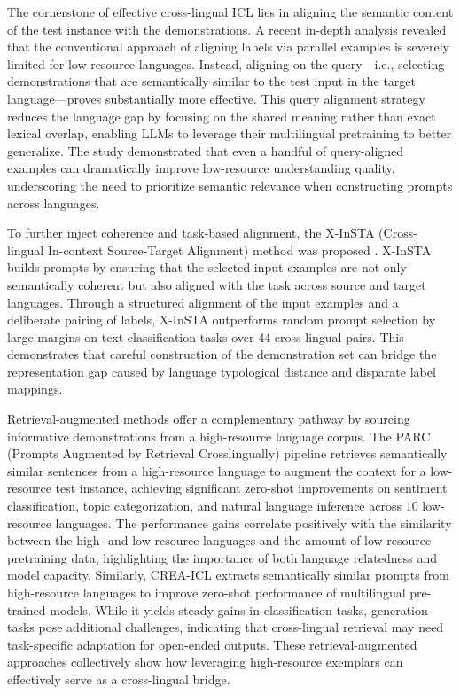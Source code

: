 \documentclass[11pt]{article}
\begin{document}
The cornerstone of effective cross-lingual ICL lies in aligning the semantic content of the test instance with the demonstrations. A recent in-depth analysis \cite{ref128} revealed that the conventional approach of aligning labels via parallel examples is severely limited for low-resource languages. Instead, aligning on the query---i.e., selecting demonstrations that are semantically similar to the test input in the target language---proves substantially more effective. This query alignment strategy reduces the language gap by focusing on the shared meaning rather than exact lexical overlap, enabling LLMs to leverage their multilingual pretraining to better generalize. The study demonstrated that even a handful of query-aligned examples can dramatically improve low-resource understanding quality, underscoring the need to prioritize semantic relevance when constructing prompts across languages.

To further inject coherence and task-based alignment, the X-InSTA (Cross-lingual In-context Source-Target Alignment) method was proposed \cite{ref127}. X-InSTA builds prompts by ensuring that the selected input examples are not only semantically coherent but also aligned with the task across source and target languages. Through a structured alignment of the input examples and a deliberate pairing of labels, X-InSTA outperforms random prompt selection by large margins on text classification tasks over 44 cross-lingual pairs. This demonstrates that careful construction of the demonstration set can bridge the representation gap caused by language typological distance and disparate label mappings.

Retrieval-augmented methods offer a complementary pathway by sourcing informative demonstrations from a high-resource language corpus. The PARC (Prompts Augmented by Retrieval Crosslingually) pipeline \cite{ref129} retrieves semantically similar sentences from a high-resource language to augment the context for a low-resource test instance, achieving significant zero-shot improvements on sentiment classification, topic categorization, and natural language inference across 10 low-resource languages. The performance gains correlate positively with the similarity between the high- and low-resource languages and the amount of low-resource pretraining data, highlighting the importance of both language relatedness and model capacity. Similarly, CREA-ICL \cite{ref130} extracts semantically similar prompts from high-resource languages to improve zero-shot performance of multilingual pre-trained models. While it yields steady gains in classification tasks, generation tasks pose additional challenges, indicating that cross-lingual retrieval may need task-specific adaptation for open-ended outputs. These retrieval-augmented approaches collectively show how leveraging high-resource exemplars can effectively serve as a cross-lingual bridge.
\end{document}
